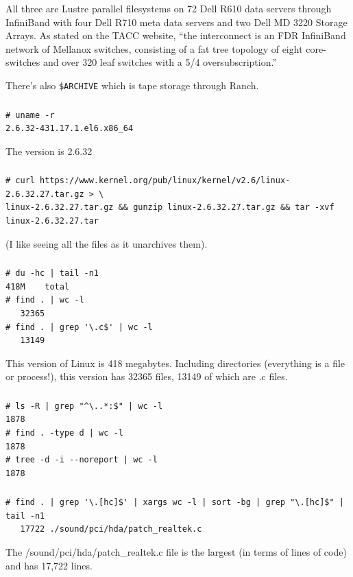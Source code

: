 \documentclass{article}
\begin{document}
All three are Lustre parallel filesystems on 72 Dell R610 data servers through InfiniBand with four Dell R710 meta data servers and two Dell MD 3220 Storage Arrays. As stated on the TACC website, ``the interconnect is an FDR InfiniBand network of Mellanox switches, consisting of a fat tree topology of eight core-switches and over 320 leaf switches with a 5/4 oversubscription.''

There's also \texttt{\$ARCHIVE} which is tape storage through Ranch.

\setcounter{subsection}{9}
\subsubsection{}
\begin{verbatim}
# uname -r
2.6.32-431.17.1.el6.x86_64
\end{verbatim}
The version is 2.6.32

\subsubsection{}
\begin{verbatim}
# curl https://www.kernel.org/pub/linux/kernel/v2.6/linux-2.6.32.27.tar.gz > \
linux-2.6.32.27.tar.gz && gunzip linux-2.6.32.27.tar.gz && tar -xvf linux-2.6.32.27.tar
\end{verbatim}
(I like seeing all the files as it unarchives them).

\subsubsection{}
\begin{verbatim}
# du -hc | tail -n1
418M	total
# find . | wc -l
   32365
# find . | grep '\.c$' | wc -l
   13149
\end{verbatim}
This version of Linux is 418 megabytes. Including directories (everything is a file or process!), this version has 32365 files, 13149 of which are .c files.

\subsubsection{}
\begin{verbatim}
# ls -R | grep "^\..*:$" | wc -l
1878
# find . -type d | wc -l
1878
# tree -d -i --noreport | wc -l
1878
\end{verbatim}

\subsubsection{}
\begin{verbatim}
# find . | grep '\.[hc]$' | xargs wc -l | sort -bg | grep "\.[hc]$" | tail -n1
   17722 ./sound/pci/hda/patch_realtek.c
\end{verbatim}
The /sound/pci/hda/patch\_realtek.c file is the largest (in terms of lines of code) and has 17,722 lines.
\end{document}
